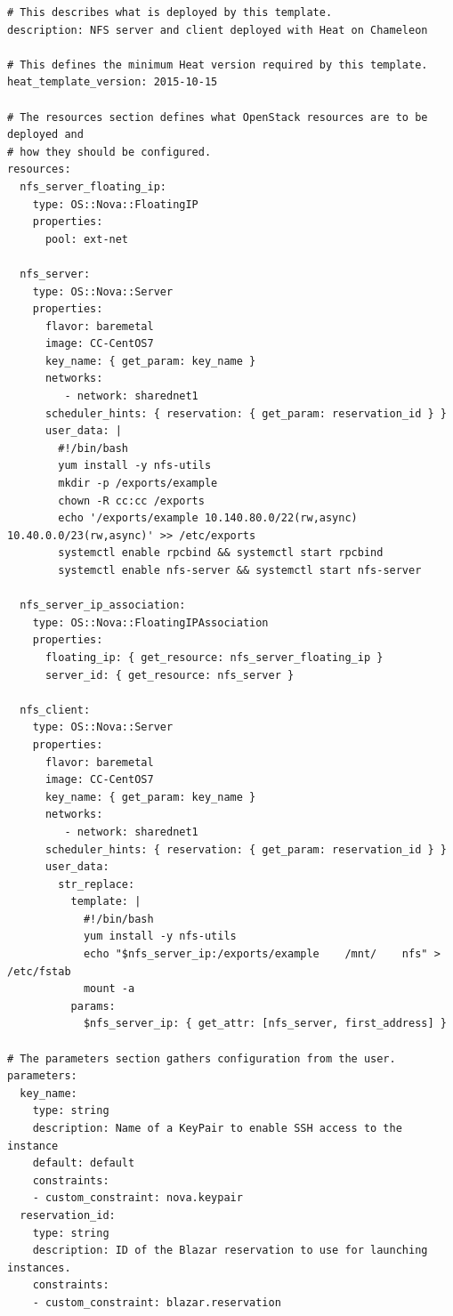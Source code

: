 \begin{footnotesize}
\begin{verbatim}
# This describes what is deployed by this template.
description: NFS server and client deployed with Heat on Chameleon

# This defines the minimum Heat version required by this template.
heat_template_version: 2015-10-15

# The resources section defines what OpenStack resources are to be deployed and
# how they should be configured.
resources:
  nfs_server_floating_ip:
    type: OS::Nova::FloatingIP
    properties:
      pool: ext-net

  nfs_server:
    type: OS::Nova::Server
    properties:
      flavor: baremetal
      image: CC-CentOS7
      key_name: { get_param: key_name }
      networks:
         - network: sharednet1
      scheduler_hints: { reservation: { get_param: reservation_id } }
      user_data: |
        #!/bin/bash
        yum install -y nfs-utils
        mkdir -p /exports/example
        chown -R cc:cc /exports
        echo '/exports/example 10.140.80.0/22(rw,async) 10.40.0.0/23(rw,async)' >> /etc/exports
        systemctl enable rpcbind && systemctl start rpcbind
        systemctl enable nfs-server && systemctl start nfs-server

  nfs_server_ip_association:
    type: OS::Nova::FloatingIPAssociation
    properties:
      floating_ip: { get_resource: nfs_server_floating_ip }
      server_id: { get_resource: nfs_server }

  nfs_client:
    type: OS::Nova::Server
    properties:
      flavor: baremetal
      image: CC-CentOS7
      key_name: { get_param: key_name }
      networks:
         - network: sharednet1
      scheduler_hints: { reservation: { get_param: reservation_id } }
      user_data:
        str_replace:
          template: |
            #!/bin/bash
            yum install -y nfs-utils
            echo "$nfs_server_ip:/exports/example    /mnt/    nfs" > /etc/fstab
            mount -a
          params:
            $nfs_server_ip: { get_attr: [nfs_server, first_address] }

# The parameters section gathers configuration from the user.
parameters:
  key_name:
    type: string
    description: Name of a KeyPair to enable SSH access to the instance
    default: default
    constraints:
    - custom_constraint: nova.keypair
  reservation_id:
    type: string
    description: ID of the Blazar reservation to use for launching instances.
    constraints:
    - custom_constraint: blazar.reservation
\end{verbatim}
\end{footnotesize}

